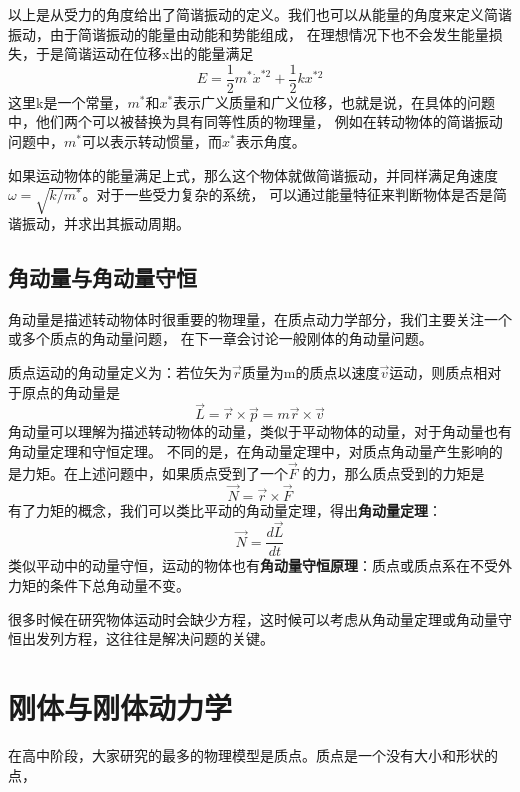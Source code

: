 \documentclass{article}
\begin{document}
    以上是从受力的角度给出了简谐振动的定义。我们也可以从能量的角度来定义简谐振动，由于简谐振动的能量由动能和势能组成，
    在理想情况下也不会发生能量损失，于是简谐运动在位移x出的能量满足
    \begin{equation*}
        E = \frac{1}{2}m^* \dot{x}^{*2} + \frac{1}{2}kx^{*2}
    \end{equation*}
    这里k是一个常量，\(m^*\)和\(x^*\)表示广义质量和广义位移，也就是说，在具体的问题中，他们两个可以被替换为具有同等性质的物理量，
    例如在转动物体的简谐振动问题中，\(m^*\)可以表示转动惯量，而\(x^*\)表示角度。

    如果运动物体的能量满足上式，那么这个物体就做简谐振动，并同样满足角速度\(\omega = \sqrt{k/m^*}\)。对于一些受力复杂的系统，
    可以通过能量特征来判断物体是否是简谐振动，并求出其振动周期。

    


    \subsection{角动量与角动量守恒}
    角动量是描述转动物体时很重要的物理量，在质点动力学部分，我们主要关注一个或多个质点的角动量问题，
    在下一章会讨论一般刚体的角动量问题。

    质点运动的角动量定义为：若位矢为\(\vec{r}\)质量为m的质点以速度\(\vec{v}\)运动，则质点相对于原点的角动量是
    \begin{equation*}
        \vec{L} = \vec{r} \times \vec{p} = m \vec{r} \times \vec{v}
    \end{equation*}
    角动量可以理解为描述转动物体的动量，类似于平动物体的动量，对于角动量也有角动量定理和守恒定理。
    不同的是，在角动量定理中，对质点角动量产生影响的是力矩。在上述问题中，如果质点受到了一个\(\vec{F}\)
    的力，那么质点受到的力矩是
    \begin{equation*}
        \vec{N} = \vec{r} \times \vec{F}
    \end{equation*}
    有了力矩的概念，我们可以类比平动的角动量定理，得出\textbf{角动量定理}：
    \begin{equation*}
        \vec{N} = \frac{d\vec{L}}{dt}
    \end{equation*}
    类似平动中的动量守恒，运动的物体也有\textbf{角动量守恒原理}：质点或质点系在不受外力矩的条件下总角动量不变。
    
    很多时候在研究物体运动时会缺少方程，这时候可以考虑从角动量定理或角动量守恒出发列方程，这往往是解决问题的关键。



\section{刚体与刚体动力学}
    在高中阶段，大家研究的最多的物理模型是质点。质点是一个没有大小和形状的点，
\end{document}
